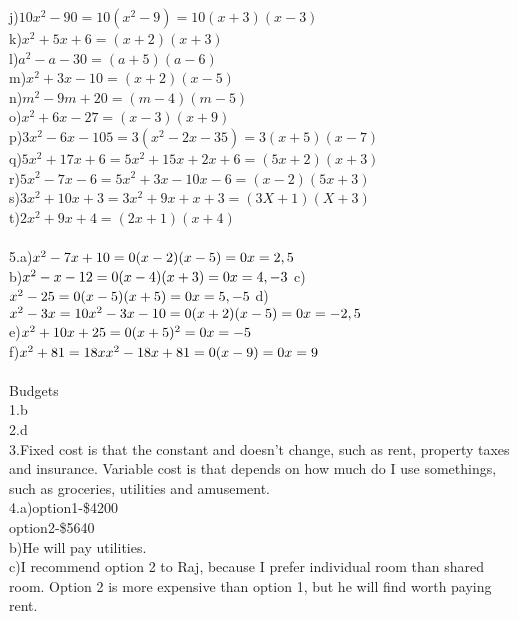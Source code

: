 \documentclass{article}
\begin{document}
j)$10x^2-90=10(x^2-9)=10(x+3)(x-3)$\\
k)$x^2+5x+6=(x+2)(x+3)$\\
l)$a^2-a-30=(a+5)(a-6)$\\
m)$x^2+3x-10=(x+2)(x-5)$\\
n)$m^2-9m+20=(m-4)(m-5)$\\
o)$x^2+6x-27=(x-3)(x+9)$\\
p)$3x^2-6x-105=3(x^2-2x-35)=3(x+5)(x-7)$\\
q)$5x^2+17x+6=5x^2+15x+2x+6=(5x+2)(x+3)$\\
r)$5x^2-7x-6=5x^2+3x-10x-6=(x-2)(5x+3)$\\
s)$3x^2+10x+3=3x^2+9x+x+3=(3X+1)(X+3)$\\
t)$2x^2+9x+4=(2x+1)(x+4)$\\
\\
5.a)$x^2-7x+10=0\\
(x-2)(x-5)=0\\
x=2,5$\\
b)$x^2-x-12=0\\
(x-4)(x+3)=0\\
x=4,-3\\$
c)$x^2-25=0\\
(x-5)(x+5)=0\\
x=5,-5\\$
d)$x^2-3x=10\\
x^2-3x-10=0\\
(x+2)(x-5)=0\\
x=-2,5$\\
e)$x^2+10x+25=0\\
(x+5)^2=0\\
x=-5$\\
f)$x^2+81=18x\\
x^2-18x+81=0\\
(x-9)=0\\
x=9$\\\\
Budgets\\
1.b\\
2.d\\
3.Fixed cost is that the constant and doesn't change, such as rent, property taxes and insurance. Variable cost is that depends on how much do I use somethings, such as groceries, utilities and amusement.\\
4.a)option1-\$4200\\
option2-\$5640\\
b)He will pay utilities.\\
c)I recommend option 2 to Raj, because I prefer individual room than shared room. Option 2 is more expensive than option 1, but he will find worth paying rent.\\
\end{document}

